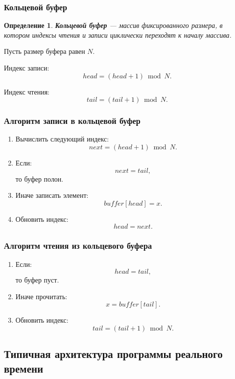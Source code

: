 \documentclass[12pt,a4paper]{article}
\newtheorem{definition}{Определение}
\begin{document}
\subsubsection{Кольцевой буфер}

\begin{definition}
\textbf{Кольцевой буфер} --- массив фиксированного размера, в котором индексы чтения и записи циклически переходят к началу массива.
\end{definition}

Пусть размер буфера равен $N$.

Индекс записи:
\[
    head = (head + 1) \bmod N.
\]

Индекс чтения:
\[
    tail = (tail + 1) \bmod N.
\]

\subsubsection{Алгоритм записи в кольцевой буфер}

\begin{enumerate}
    \item Вычислить следующий индекс:
    \[
        next = (head + 1) \bmod N.
    \]
    \item Если:
    \[
        next = tail,
    \]
    то буфер полон.
    \item Иначе записать элемент:
    \[
        buffer[head] = x.
    \]
    \item Обновить индекс:
    \[
        head = next.
    \]
\end{enumerate}

\subsubsection{Алгоритм чтения из кольцевого буфера}

\begin{enumerate}
    \item Если:
    \[
        head = tail,
    \]
    то буфер пуст.
    \item Иначе прочитать:
    \[
        x = buffer[tail].
    \]
    \item Обновить индекс:
    \[
        tail = (tail + 1) \bmod N.
    \]
\end{enumerate}

\subsection{Типичная архитектура программы реального времени}
\end{document}
